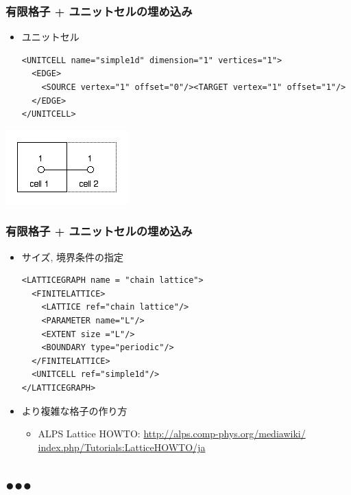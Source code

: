 \begin{frame}[t, fragile]
  \frametitle{有限格子 + ユニットセルの埋め込み}
  \begin{itemize}
  \item ユニットセル
  \begin{lstlisting}
<UNITCELL name="simple1d" dimension="1" vertices="1">
  <EDGE>
    <SOURCE vertex="1" offset="0"/><TARGET vertex="1" offset="1"/>
  </EDGE>
</UNITCELL>
\end{lstlisting}
  \end{itemize}
  \begin{center}
    \includegraphics[height=0.25\textheight]{TutorialLatticeHOWTOLatticegraph3}
  \end{center}
\end{frame}

\begin{frame}[t,fragile]
  \frametitle{有限格子 + ユニットセルの埋め込み}
  \begin{itemize}
  \item サイズ, 境界条件の指定
    \begin{lstlisting}
<LATTICEGRAPH name = "chain lattice">
  <FINITELATTICE>
    <LATTICE ref="chain lattice"/>
    <PARAMETER name="L"/>
    <EXTENT size ="L"/>
    <BOUNDARY type="periodic"/>
  </FINITELATTICE>
  <UNITCELL ref="simple1d"/>
</LATTICEGRAPH>
\end{lstlisting}
  \item より複雑な格子の作り方
    \begin{itemize}
    \item ALPS Lattice HOWTO: {\small \href{http://alps.comp-phys.org/mediawiki/index.php/Tutorials:LatticeHOWTO/ja}{http://alps.comp-phys.org/mediawiki/ index.php/Tutorials:LatticeHOWTO/ja}}
    \end{itemize}
  \end{itemize}
\end{frame}

\subsection*{{\protect\color{red}●}{\protect\color{blue}●}{\protect\color{green}●}}

